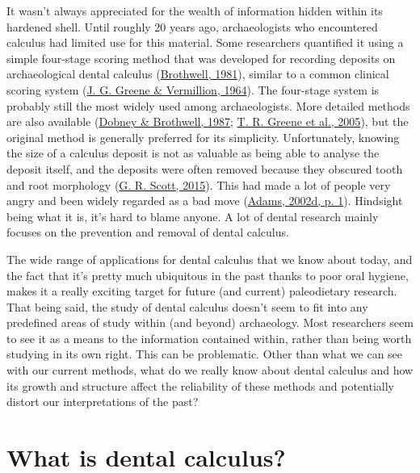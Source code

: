 \documentclass[
  letterpaper,
]{book}
\begin{document}
It wasn't always appreciated for the wealth of information hidden within
its hardened shell. Until roughly 20 years ago, archaeologists who
encountered calculus had limited use for this material. Some researchers
quantified it using a simple four-stage scoring method that was
developed for recording deposits on archaeological dental calculus
(\protect\hyperlink{ref-brothwellDiggingBones1981}{Brothwell, 1981}),
similar to a common clinical scoring system
(\protect\hyperlink{ref-greeneSimplifiedOral1964}{J. G. Greene \&
Vermillion, 1964}). The four-stage system is probably still the most
widely used among archaeologists. More detailed methods are also
available (\protect\hyperlink{ref-dobneyMethodEvaluating1987}{Dobney \&
Brothwell, 1987};
\protect\hyperlink{ref-greeneQuantifyingCalculus2005}{T. R. Greene et
al., 2005}), but the original method is generally preferred for its
simplicity. Unfortunately, knowing the size of a calculus deposit is not
as valuable as being able to analyse the deposit itself, and the
deposits were often removed because they obscured tooth and root
morphology (\protect\hyperlink{ref-scottBriefHistory2015}{G. R. Scott,
2015}). This had made a lot of people very angry and been widely
regarded as a bad move
(\protect\hyperlink{ref-adamsRestaurantEnd2002}{Adams, 2002d, p. 1}).
Hindsight being what it is, it's hard to blame anyone. A lot of dental
research mainly focuses on the prevention and removal of dental
calculus.

The wide range of applications for dental calculus that we know about
today, and the fact that it's pretty much ubiquitous in the past thanks
to poor oral hygiene, makes it a really exciting target for future (and
current) paleodietary research. That being said, the study of dental
calculus doesn't seem to fit into any predefined areas of study within
(and beyond) archaeology. Most researchers seem to see it as a means to
the information contained within, rather than being worth studying in
its own right. This can be problematic. Other than what we can see with
our current methods, what do we really know about dental calculus and
how its growth and structure affect the reliability of these methods and
potentially distort our interpretations of the past?

\hypertarget{intro-what}{%
\section{What is dental calculus?}\label{intro-what}}
\end{document}
